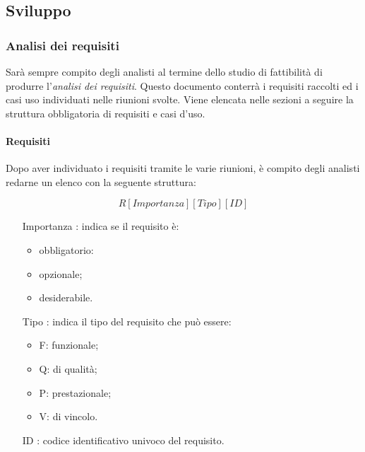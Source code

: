 \subsection{Sviluppo}
	\subsubsection{Analisi dei requisiti}
	Sarà sempre compito degli analisti al termine dello studio di fattibilità di produrre l'\textit{analisi dei requisiti}. Questo documento conterrà i requisiti raccolti ed i casi uso individuati nelle riunioni svolte.
	Viene elencata nelle sezioni a seguire la struttura obbligatoria di requisiti e casi d'uso.
		\paragraph{Requisiti}%
		Dopo aver individuato i requisiti tramite le varie riunioni, è compito degli analisti redarne un elenco con la seguente struttura:
		
		\begin{equation}
			R[Importanza][Tipo][ID]
		\end{equation}
		
		\begin{itemize}
		
			\item[Importanza]: indica se il requisito è:
			
			\begin{itemize}
				\item obbligatorio:
				\item opzionale;
				\item desiderabile.
			\end{itemize}
			
			\item[Tipo]: indica il tipo del requisito che può essere:
			
			\begin{itemize}
				\item F: funzionale;
				\item Q: di qualità;
				\item P: prestazionale;
				\item V: di vincolo.
			\end{itemize}
			
			\item[ID]: codice identificativo univoco del requisito.
			
		\end{itemize}
		
